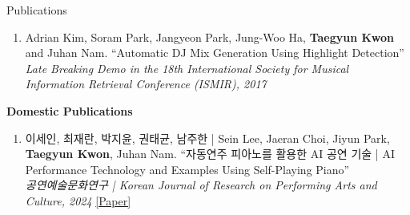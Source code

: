 \begin{rSection}{Publications}
\begin{enumerate}
\begin{minipage}[t]{\linewidth}
\end{minipage}
\item \begin{minipage}[t]{\linewidth}Adrian Kim, Soram Park, Jangyeon Park, Jung-Woo Ha, \textbf{Taegyun Kwon} and Juhan Nam.
``Automatic DJ Mix Generation Using Highlight Detection''\\\textit{Late Breaking Demo in the 18th International Society for Musical Information Retrieval Conference (ISMIR), 2017}
\end{minipage}
\end{enumerate}
\textbf{Domestic Publications}
\begin{enumerate}
\item \begin{minipage}[t]{\linewidth}이세인, 최재란, 박지윤, 권태균, 남주한 | Sein Lee, Jaeran Choi, Jiyun Park, \textbf{Taegyun Kwon}, Juhan Nam.
``자동연주 피아노를 활용한 AI 공연 기술 | AI Performance Technology and Examples Using Self-Playing Piano''\\\textit{공연예술문화연구 | Korean Journal of Research on Performing Arts and Culture, 2024}
\href{https://www.ntok.go.kr/kr/Museum/archive/JournalDetails?ArticleId=205369}{[Paper]}
\end{minipage}
\end{enumerate}
\end{rSection}
